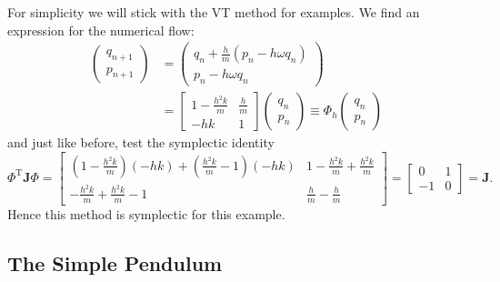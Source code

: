 \documentclass{report}
\theoremstyle{exampstyle} \newtheorem{example}[theorem]{Example}
\theoremstyle{exampstyle} \newtheorem{remark}[theorem]{Remark}
\theoremstyle{exampstyle} \newtheorem{definition}[theorem]{Definition}
\theoremstyle{exampstyle} \newtheorem{lemma}[theorem]{Lemma}
\begin{document}
For simplicity we will stick with the VT method for examples.
We find an expression for the numerical flow:
\begin{equation*}
	\begin{aligned}
		\begin{pmatrix}
			q_{n+1} \\
			p_{n+1} 
		\end{pmatrix} &= \begin{pmatrix}
			q_{n} + \frac{h}{m} \left( p_{n} - h \omega q_n \right) \\
			p_{n} - h \omega q_n
		\end{pmatrix} \\
		&= \begin{bmatrix}
			1 - \frac{h^2 k}{m} & \frac{h}{m} \\
			-hk & 1
		\end{bmatrix} \begin{pmatrix}
			q_n \\
			p_n
		\end{pmatrix} \equiv \Phi_h \begin{pmatrix}
			q_n \\
			p_n
		\end{pmatrix}
	\end{aligned}
\end{equation*}
and just like before, test the symplectic identity
\begin{equation*}
	\Phi^\mathrm{T}\mathbf{J}\Phi = \begin{bmatrix}
		\left(1-\frac{h^2 k}{m}\right)(-hk) + \left(\frac{h^2 k}{m}-1\right)(-hk) & 1 - \frac{h^2 k}{m} + \frac{h^2 k}{m} \\
		-\frac{h^2 k}{m} + \frac{h^2 k}{m} -1 & \frac{h}{m} - \frac{h}{m}
	\end{bmatrix} = \begin{bmatrix}
		0 & 1 \\
		-1 & 0
	\end{bmatrix} = \mathbf{J}.
\end{equation*}
Hence this method is symplectic for this example.

\subsection{The Simple Pendulum}

\end{document}
